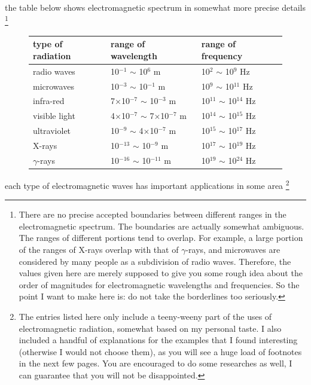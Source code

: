 \cmt the table below shows electromagnetic spectrum in somewhat more precise details \footnote[][-2cm]{There are no precise accepted boundaries between different ranges in the electromagnetic spectrum. The boundaries are actually somewhat ambiguous. The ranges of different portions tend to overlap. For example, a large portion of the ranges of X-rays overlap with that of $\gamma$-rays, and microwaves are considered by many people as a subdivision of radio waves. Therefore, the values given here are merely supposed to give you some rough idea about the order of magnitudes for electromagnetic wavelengths and frequencies. So the point I want to make here is: do not take the borderlines too seriously.}
\vspace{3cm}
\begin{figure}
\begin{center}
	\begin{tabular}{|C{4cm}|C{4cm}|C{4cm}|}
		\hline type of radiation & range of wavelength & range of frequency \\ 
		\hline radio waves  & 10$^{-1}$ $\sim$ 10$^{6}$ m & 10$^{2}$ $\sim$ 10$^{9}$ Hz \\ 
		\hline microwaves & 10$^{-3}$ $\sim$ 10$^{-1}$ m & 10$^{9}$ $\sim$ 10$^{11}$ Hz \\ 
		\hline infra-red & 7$\times$10$^{-7}$ $\sim$ 10$^{-3}$ m & 10$^{11}$ $\sim$ 10$^{14}$ Hz \\ 
		\hline visible light  & 4$\times$10$^{-7}$ $\sim$ 7$\times$10$^{-7}$ m & 10$^{14}$ $\sim$ 10$^{15}$ Hz \\ 
		\hline ultraviolet & 10$^{-9}$ $\sim$ 4$\times$10$^{-7}$ m & 10$^{15}$ $\sim$ 10$^{17}$ Hz \\ 
		\hline X-rays & 10$^{-13}$ $\sim$ 10$^{-9}$ m & 10$^{17}$ $\sim$ 10$^{19}$ Hz \\ 
		\hline $\gamma$-rays & 10$^{-16}$ $\sim$ 10$^{-11}$ m & 10$^{19}$ $\sim$ 10$^{24}$ Hz\\ 
		\hline
	\end{tabular} 
\end{center}
\end{figure}

\cmt each type of electromagnetic waves has important applications in some area
\footnote{The entries listed here only include a teeny-weeny part of the uses of electromagnetic radiation, somewhat based on my personal taste. I also included a handful of explanations for the examples that I found interesting (otherwise I would not choose them), as you will see a huge load of footnotes in the next few pages. You are encouraged to do some researches as well, I can guarantee that you will not be disappointed.}

